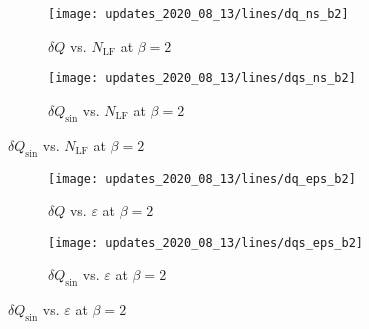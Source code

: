 \clearpage
\begin{figure}[h!]
  \centering
  \begin{subfigure}[htpb]{0.4725\textwidth}
    \texttt{[image: updates\_2020\_08\_13/lines/dq\_ns\_b2]}
    \caption{\(\delta Q\) vs. \(N_{\mathrm{LF}}\) at \(\beta = 2\)}%
  \end{subfigure}
  \begin{subfigure}[htpb]{0.4725\textwidth}
    \texttt{[image: updates\_2020\_08\_13/lines/dqs\_ns\_b2]}
    \caption{\(\delta Q_{\sin}\) vs. \(N_{\mathrm{LF}}\) at \(\beta = 2\)}%
  \end{subfigure}
\end{figure}
%
\begin{figure}[h!]
  \centering
  \begin{subfigure}[htpb]{0.4725\textwidth}
    \texttt{[image: updates\_2020\_08\_13/lines/dq\_eps\_b2]}
    \caption{\(\delta Q\) vs. \(\varepsilon\) at \(\beta = 2\)}%
  \end{subfigure}
  \begin{subfigure}[htpb]{0.4725\textwidth}
    \texttt{[image: updates\_2020\_08\_13/lines/dqs\_eps\_b2]}
    \caption{\(\delta Q_{\sin}\) vs. \(\varepsilon\) at \(\beta = 2\)}%
  \end{subfigure}
\end{figure}
%

